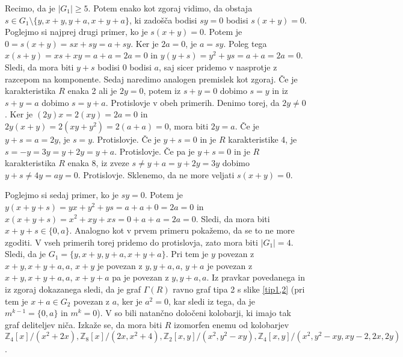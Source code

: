 \documentclass[a4paper, 12pt]{amsart}
\theoremstyle{definition} %
\theoremstyle{plain} %
\newcommand{\Z}{\mathbb Z}
\begin{document}
Recimo, da je $|G_1| \ge 5$. Potem enako kot zgoraj vidimo, da obstaja $s\in G_1 \setminus \{y,x+y,y+a,x+y+a\}$, ki zadošča bodisi $sy = 0$ bodisi $s(x+y)=0$. Poglejmo si najprej drugi primer, ko je $s(x+y) = 0$. Potem je $0 = s(x+y) = sx + sy = a + sy$. Ker je $2a = 0$, je $a=sy$. Poleg tega $x(s+y) = xs +xy = a + a = 2a = 0$ in $y(y+s) = y^2 + ys = a + a = 2a = 0$. Sledi, da mora biti $y+s$ bodisi $0$ bodisi $a$, saj sicer pridemo v nasprotje z razcepom na komponente. Sedaj naredimo analogen premislek kot zgoraj. Če je karakteristika $R$ enaka 2 ali je $2y = 0$, potem iz $s+y=0$ dobimo $s=y$ in iz $s+y = a$ dobimo $s = y+a$. Protislovje v obeh primerih. Denimo torej, da $2y\neq 0$. Ker je $(2y)x = 2 (xy) = 2a=0$ in $2y(x+y) = 2(xy + y^2 ) = 2 (a+ a) = 0$, mora biti $2y = a$. Če je $y+s = a = 2y $, je $s = y$. Protislovje. Če je $y+s = 0$ in je $R$ karakteristike 4, je $s = -y = 3y = y +2y = y+a$. Protislovje. Če pa je $y+s = 0$ in je $R$ karakteristika $R$ enaka 8, iz zveze $s \neq y+a = y+ 2y = 3y$ dobimo $y+s \neq 4y = ay =0$. Protislovje. Sklenemo, da ne more veljati $s(x+y) = 0$.

Poglejmo si sedaj primer, ko je $sy = 0$. Potem je $y(x+y+s) = yx + y^2 + ys = a + a + 0= 2a = 0$ in $x(x+y+s) = x^2 + xy + xs = 0 + a + a = 2a = 0$. Sledi, da mora biti $x+y+s\in \{0,a\}$. Analogno kot v prvem primeru pokažemo, da se to ne more zgoditi. V vseh primerih torej pridemo do protislovja, zato mora biti $|G_1| = 4$. Sledi, da je $G_1 = \{y,x+y,y+a,x+y+a\}$. Pri tem je $y$ povezan z $x+y,x+y+a,a$, $x+y$ je povezan z $y,y+a,a$, $y+a$ je povezan z $x+y,x+y+a,a$, $x+y+a$ pa je povezan z $y,y+a,a$. Iz pravkar povedanega in iz zgoraj dokazanega sledi, da je graf $\Gamma(R)$ ravno graf tipa 2 s slike \ref{tip1,2} (pri tem je $x+a\in G_2$ povezan z $a$, ker je $a^2 = 0$, kar sledi iz tega, da je $m^{k-1}=\{0,a\}$ in $m^k=0$). V \cite{Redmond} so bili natančno določeni kolobarji, ki imajo tak graf deliteljev niča. Izkaže se, da mora biti $R$ izomorfen enemu od kolobarjev $\Z_4[x]/(x^2 + 2x), \Z_8[x]/(2x, x^2 + 4), \Z_2[x,y]/(x^2,y^2 - xy), \Z_4[x,y]/(x^2,y^2 - xy, xy-2,2x,2y)$.
\end{document}
